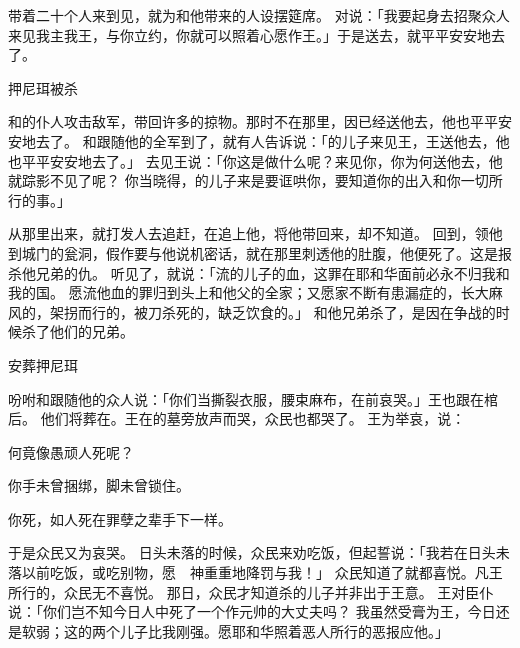 {带着二十个人来到{}见{}，{}就为{}和他带来的人设摆筵席。
对{}说：「我要起身去招聚{}众人来见我主我王，与你立约，你就可以照着心愿作王。」于是{}送{}去，{}就平平安安地去了。
\par }{\SH 押尼珥被杀
\par }{\PP {}和{}的仆人攻击敌军，带回许多的掠物。那时{}不在{}{}那里，因{}已经送他去，他也平平安安地去了。
和跟随他的全军到了，就有人告诉{}说：「{}的儿子{}来见王，王送他去，他也平平安安地去了。」
去见王说：「你这是做什么呢？{}来见你，你为何送他去，他就踪影不见了呢？
你当晓得，{}的儿子{}来是要诓哄你，要知道你的出入和你一切所行的事。」
\par }{\PP {}从{}那里出来，就打发人去追赶{}，在{}追上他，将他带回来，{}却不知道。
回到{}，{}领他到城门的瓮洞，假作要与他说机密话，就在那里刺透他的肚腹，他便死了。这是报杀他兄弟{}的仇。
听见了，就说：「流{}的儿子{}的血，这罪在耶和华面前必永不归我和我的国。
愿流他血的罪归到{}头上和他父的全家；又愿{}家不断有患漏症的，长大麻风的，架拐而行的，被刀杀死的，缺乏饮食的。」
和他兄弟{}杀了{}，是因{}在{}争战的时候杀了他们的兄弟{}。
\par }{\SH 安葬押尼珥
\par }{\PP {}吩咐{}和跟随他的众人说：「你们当撕裂衣服，腰束麻布，在{}{}前哀哭。」{}王也跟在棺后。
他们将{}葬在{}。王在{}的墓旁放声而哭，众民也都哭了。
王为{}举哀，说：
\par }{何竟像愚顽人死呢？
\par }{\Q {}你手未曾捆绑，脚未曾锁住。
\par }{\Q 你死，如人死在罪孽之辈手下一样。
\par }{\MM 于是众民又为{}哀哭。
日头未落的时候，众民来劝{}吃饭，但{}起誓说：「我若在日头未落以前吃饭，或吃别物，愿　神重重地降罚与我！」
众民知道了就都喜悦。凡王所行的，众民无不喜悦。
那日，{}众民才知道杀{}的儿子{}并非出于王意。
王对臣仆说：「你们岂不知今日{}人中死了一个作元帅的大丈夫吗？
我虽然受膏为王，今日还是软弱；这{}的两个儿子比我刚强。愿耶和华照着恶人所行的恶报应他。」

}
